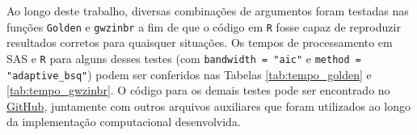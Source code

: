 \documentclass[12pt, a4paper, twoside]{report}
\numberwithin{equation}{section} %
\begin{document}

Ao longo deste trabalho, diversas combinações de argumentos foram testadas nas funções \texttt{Golden} e \texttt{gwzinbr} a fim de que o código em \texttt{R} fosse capaz de reproduzir resultados corretos para quaisquer situações. Os tempos de processamento em SAS e \texttt{R} para alguns desses testes (com \texttt{bandwidth = "aic"} e \texttt{method = "adaptive\_bsq"}) podem ser conferidos nas Tabelas \ref{tab:tempo_golden} e \ref{tab:tempo_gwzinbr}. O código para os demais testes pode ser encontrado no \href{https://github.com/julianamrosa/GWZINBR_TCC}{GitHub}, juntamente com outros arquivos auxiliares que foram utilizados ao longo da implementação computacional desenvolvida.

\end{document}
